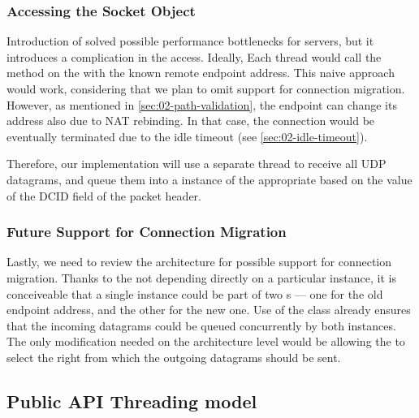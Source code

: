\subsubsection{Accessing the Socket Object}

Introduction of \QuicConnectionContext{} solved possible performance bottlenecks for servers, but it
introduces a complication in the \Socket{} access. Ideally, Each thread would call the
 method on the \Socket{} with the known remote endpoint address. This
naive approach would work, considering that we plan to omit support for connection migration.
However, as mentioned in \autoref{sec:02-path-validation}, the endpoint can change its address also
due to NAT rebinding. In that case, the connection would be eventually terminated due to the idle
timeout (see \autoref{sec:02-idle-timeout}).

Therefore, our implementation will use a separate thread to receive all UDP datagrams, and queue
them into a  instance of the appropriate \QuicConnectionContext{} based on the
value of the DCID field of the packet header.

\subsubsection{Future Support for Connection Migration}

Lastly, we need to review the architecture for possible support for connection migration. Thanks to
the \QuicConnectionContext{} not depending directly on a particular \Socket{} instance, it is
conceiveable that a single \QuicConnectionContext{} instance could be part of two
\QuicSocketContext{}s --- one for the old endpoint address, and the other for the new one. Use of the
 class already ensures that the incoming datagrams could be queued concurrently by
both \QuicSocketContext{} instances. The only modification needed on the architecture level would be
allowing the \QuicConnectionContext{} to select the right \Socket{} from which the outgoing
datagrams should be sent.

\subsection{Public API Threading model}


